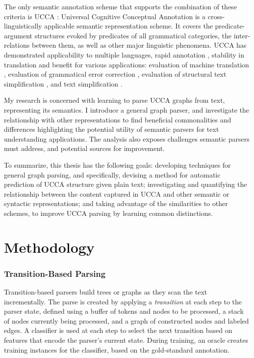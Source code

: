 \documentclass[12pt,a4paper]{report}
\begin{document}
The only semantic annotation scheme that supports the combination of these criteria is UCCA
\citep{abend2013universal}:
Universal Cognitive Conceptual Annotation
is a cross-linguistically applicable semantic representation scheme.
It covers the predicate-argument
structures evoked by predicates of all grammatical categories, the inter-relations between them,
as well as other major linguistic phenomena.
UCCA has demonstrated applicability to multiple languages,
rapid annotation \citep{abend2017uccaapp},
stability in translation \citep{sulem2015conceptual}
and benefit for various applications:
evaluation of machine translation \citep{birch2016hume},
evaluation of grammatical error correction \citep{choshen2018reference},
evaluation of structural text simplification \citep{sulem2018semantic},
and text simplification \citep{sulem2018simple}.

My research is concerned with learning to parse UCCA graphs from text, representing its semantics.
I introduce a general graph parser,
and investigate the relationship with other representations to find beneficial commonalities and
differences highlighting the potential utility of semantic parsers for text understanding applications.
The analysis also exposes challenges semantic parsers must address,
and potential sources for improvement.

To summarize, this thesis has the following goals:
developing techniques for general graph parsing, and
specifically, devising a method for automatic prediction of UCCA
    structure given plain text;
investigating and quantifying the relationship between the content
    captured in UCCA and other semantic or syntactic representations;
and taking advantage of the similarities to other schemes,
    to improve UCCA parsing by learning common distinctions.

\chapter{Methodology}

\subsection*{Transition-Based Parsing}

Transition-based parsers \citep{Nivre03anefficient} build trees or graphs
as they scan the text incrementally.
The parse is created by applying a \textit{transition} at each step to the parser state,
defined using a buffer of tokens and nodes to be processed,
a stack of nodes currently being processed,
and a graph of constructed nodes and labeled edges.
A classifier is used at each step to select the next transition based on features
that encode the parser's current state.
During training, an oracle creates training instances for the classifier,
based on the gold-standard annotation.
\end{document}
